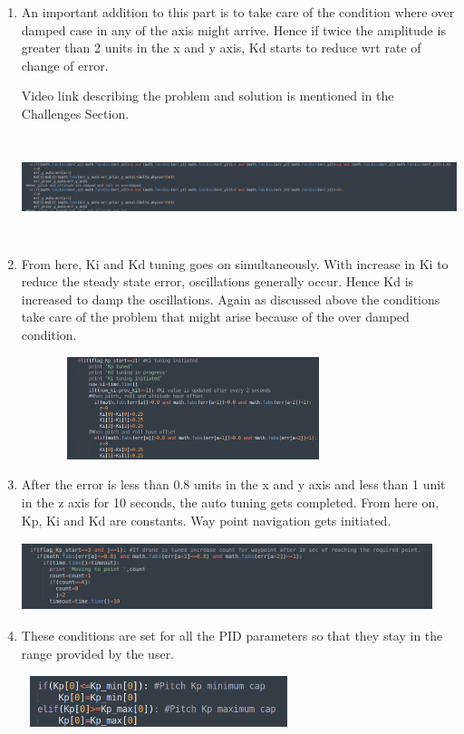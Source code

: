 \documentclass[a4paper,12pt,oneside]{book}
\begin{document}
\begin{enumerate}
\item An important addition to this part is to take care of the condition where over damped case in any of the axis might arrive.
Hence if twice the amplitude is greater than 2 units in the x and y axis, Kd starts to reduce wrt rate of change of error.

Video link describing the problem and solution is mentioned in the Challenges Section.

\includegraphics[width = 13.5cm , height= 3cm]{PID_err_8(5).png}


\item From here, Ki and Kd tuning goes on simultaneously. With increase in Ki to reduce the steady state error, oscillations generally occur. Hence Kd is increased to damp the oscillations. Again as discussed above the conditions take care of the problem that might arise because of the over damped condition.

\includegraphics[width = 10cm , height= 3cm]{PID_err_8(6).png}


\item After the error is less than 0.8 units in the x and y axis and less than 1 unit in the z axis for 10 seconds, the auto tuning gets completed. From here on, Kp, Ki and Kd are constants. Way point navigation gets initiated.


\includegraphics[width = 12cm , height= 2cm]{PID_err_8(7).png}


\item These conditions are set for all the PID parameters so that they stay in the range provided by the user.


\includegraphics[width = 8cm , height= 1.5cm]{PID_err_8(8).png}



\end{enumerate}
\end{document}
